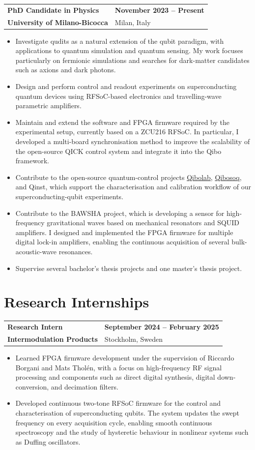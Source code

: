 \documentclass[10pt,a4paper]{article}
\makeatletter
\newcommand{\cvsection}[1]{%
  \Needspace{7\baselineskip}%
  \section{#1}%
}
\newcommand{\cventry}[4]{%
  \Needspace{4\baselineskip}%
  \par\addvspace{0.45em}%
  \begin{tabularx}{\textwidth}{@{}X>{\raggedleft\arraybackslash}p{5.45cm}@{}}
    {\large\bfseries\color{DarkGrey}#1} & {\small\bfseries\color{AccentMuted}#3} \\
    {\bfseries\color{Accent}#2} & {\small\color{BodyGrey}#4}
  \end{tabularx}%
  \vspace{-0.2em}
}
\makeatother
\begin{document}
\cventry{PhD Candidate in Physics}{University of Milano-Bicocca}{November 2023 -- Present}{Milan, Italy}
\begin{itemize}
  \item Investigate qudits as a natural extension of the qubit paradigm, with applications to quantum simulation and quantum sensing. My work focuses particularly on fermionic simulations and searches for dark-matter candidates such as axions and dark photons.
  \item Design and perform control and readout experiments on superconducting quantum devices using RFSoC-based electronics and travelling-wave parametric amplifiers.
  \item Maintain and extend the software and FPGA firmware required by the experimental setup, currently based on a ZCU216 RFSoC. In particular, I developed a multi-board synchronisation method to improve the scalability of the open-source QICK control system and integrate it into the Qibo framework.
  \item Contribute to the open-source quantum-control projects \href{https://github.com/qiboteam/qibolab}{Qibolab}, \href{https://github.com/qiboteam/qibosoq}{Qibosoq}, and Qinst, which support the characterisation and calibration workflow of our superconducting-qubit experiments.
  \item Contribute to the BAWSHA project, which is developing a sensor for high-frequency gravitational waves based on mechanical resonators and SQUID amplifiers. I designed and implemented the FPGA firmware for multiple digital lock-in amplifiers, enabling the continuous acquisition of several bulk-acoustic-wave resonances.
  \item Supervise several bachelor's thesis projects and one master's thesis project.
\end{itemize}

\cvsection{Research Internships}

\cventry{Research Intern}{Intermodulation Products}{September 2024 -- February 2025}{Stockholm, Sweden}
\begin{itemize}
  \item Learned FPGA firmware development under the supervision of Riccardo Borgani and Mats Thol\'en, with a focus on high-frequency RF signal processing and components such as direct digital synthesis, digital down-conversion, and decimation filters.
  \item Developed continuous two-tone RFSoC firmware for the control and characterisation of superconducting qubits. The system updates the swept frequency on every acquisition cycle, enabling smooth continuous spectroscopy and the study of hysteretic behaviour in nonlinear systems such as Duffing oscillators.
\end{itemize}
\end{document}

